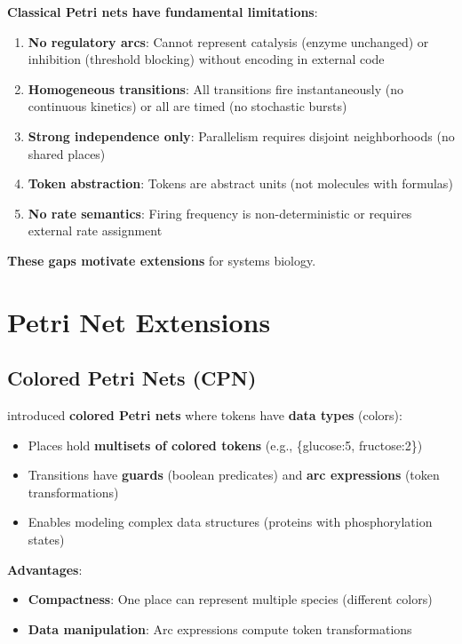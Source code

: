 \textbf{Classical Petri nets have fundamental limitations}:

\begin{enumerate}
    \item \textbf{No regulatory arcs}: Cannot represent catalysis (enzyme unchanged) or inhibition (threshold blocking) without encoding in external code
    \item \textbf{Homogeneous transitions}: All transitions fire instantaneously (no continuous kinetics) or all are timed (no stochastic bursts)
    \item \textbf{Strong independence only}: Parallelism requires disjoint neighborhoods (no shared places)
    \item \textbf{Token abstraction}: Tokens are abstract units (not molecules with formulas)
    \item \textbf{No rate semantics}: Firing frequency is non-deterministic or requires external rate assignment
\end{enumerate}

\textbf{These gaps motivate extensions} for systems biology.

\section{Petri Net Extensions}
\label{sec:pn-extensions}

\subsection{Colored Petri Nets (CPN)}
\label{subsec:colored-pn}

\citet{Jensen1981} introduced \textbf{colored Petri nets} where tokens have \textbf{data types} (colors):

\begin{itemize}
    \item Places hold \textbf{multisets of colored tokens} (e.g., \{glucose:5, fructose:2\})
    \item Transitions have \textbf{guards} (boolean predicates) and \textbf{arc expressions} (token transformations)
    \item Enables modeling complex data structures (proteins with phosphorylation states)
\end{itemize}

\textbf{Advantages}:

\begin{itemize}
    \item \textbf{Compactness}: One place can represent multiple species (different colors)
    \item \textbf{Data manipulation}: Arc expressions compute token transformations
\end{itemize}

